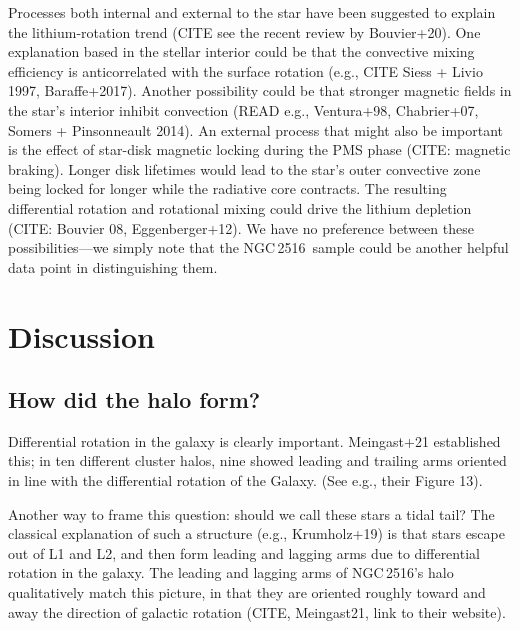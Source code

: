 \documentclass[12pt,twocolumn,tighten]{aastex63}
\newcommand{\cn}{NGC\,2516} %
\begin{document}
% 

Processes both internal and external to the star have been suggested to explain
the lithium-rotation trend (CITE see the recent review by Bouvier+20).
One explanation based in the stellar interior could be that the
convective mixing efficiency is anticorrelated with the surface
rotation (e.g., CITE Siess + Livio 1997, Baraffe+2017).  Another
possibility could be that stronger magnetic fields in the star's
interior inhibit convection (READ e.g., Ventura+98, Chabrier+07,
Somers + Pinsonneault 2014).  An external process that might also be
important is the effect of star-disk magnetic locking during the PMS
phase (CITE: magnetic braking).  Longer disk lifetimes would lead to
the star's outer convective zone being locked for longer while the
radiative core contracts.  The resulting differential rotation and
rotational mixing could drive the lithium depletion (CITE: Bouvier 08,
Eggenberger+12).
We have no preference between these possibilities---we simply note
that the \cn\ sample could be another helpful data point in
distinguishing them.



\section{Discussion}
\label{sec:discussion}

\subsection{How did the halo form?}
\label{subsec:origin}

Differential rotation in the galaxy is clearly important. Meingast+21
established this; in ten different cluster halos, nine showed leading
and trailing arms oriented in line with the differential rotation of
the Galaxy.
(See e.g., their Figure 13).


Another way to frame this question: should we call these stars a tidal
tail?
The classical explanation of such a structure (e.g., Krumholz+19) is
that stars escape out of L1 and L2, and then form leading and lagging
arms due to differential rotation in the galaxy.
The leading and lagging arms of NGC\,2516's halo qualitatively
match this picture, in that they are oriented roughly toward and away
the direction of galactic rotation (CITE, Meingast21, link to their
website).
\end{document}

